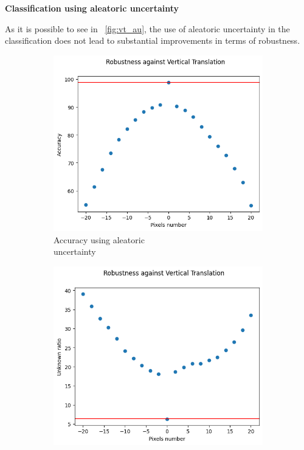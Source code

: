 \vspace{0.3cm}
\textbf{Classification using aleatoric uncertainty}
\vspace{0.1cm}

As it is possible to see in \Fig~\ref{fig:vt_au}, the use of aleatoric uncertainty in the classification does not lead to substantial improvements in terms of robustness.

\begin{figure}[h]
	\centering
	\begin{subfigure}{.33\textwidth}
		\centering
		\includegraphics[width=0.9\linewidth]{ImageFiles/EvalBNN/VT/AU/acc}
		\caption{Accuracy using aleatoric \\ uncertainty}
		\label{fig:vt_au_acc}
	\end{subfigure}%
	\begin{subfigure}{.33\textwidth}
		\centering
		\includegraphics[width=0.9\linewidth]{ImageFiles/EvalBNN/VT/AU/unkn}

\end{subfigure}
\end{figure}
